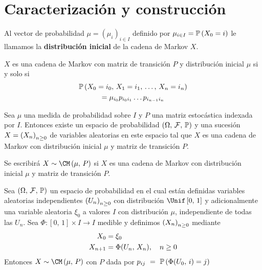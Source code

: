 \section{Caracterización y construcción}

\begin{definition}
Al vector de probabilidad $\mu = (\mu_{i})_{i\in I}$ definido por $\mu_{i\in I} = \mathbb{P}\left(X_0 = i\right)$ le llamamos la \textbf{distribución inicial} de la cadena de Markov $X$.
\end{definition}

\begin{proposition}
$X$ es una cadena de Markov con matriz de transición $P$ y distribución inicial $\mu$ si y solo si
\begin{multline}
    \mathbb{P}\left(X_0 = i_0,\, X_1 = i_1,\, \ldots,\, X_n = i_n\right) \\
    = \mu_{i_0} p_{i_0 i_1} \ldots p_{i_{n-1} i_n}
\end{multline}
\end{proposition}

\begin{theorem}
Sea $\mu$ una medida de probabilidad sobre $I$ y $P$ una matriz estocástica indexada por $I$. Entonces existe un espacio de probabilidad $(\Omega,\, \mathcal{F},\, \mathbb{P})$ y una sucesión $X = \left(X_{n}\right)_{n\geq 0}$ de variables aleatorias en este espacio tal que $X$ es una cadena de Markov con distribución inicial $\mu$ y matriz de transición $P$.
\end{theorem}

\begin{notation}
Se escribirá $X \dist \CMf{\mu}{P}$ si $X$ es una cadena de Markov con distribución inicial $\mu$ y matriz de transición $P$.
\end{notation}

\begin{theorem}
Sea $(\Omega,\, \mathcal{F},\, \mathbb{P})$ un espacio de probabilidad en el cual están definidas variables aleatorias independientes $\left(U_{n}\right)_{n\geq 0}$ con distribución $\Uniff{0}{1}$ y adicionalmente una variable aleatoria $\xi_{0}$ a valores $I$ con distribución $\mu$, independiente de todas las $U_n$. Sea $\Phi:[0,\, 1] \times I \to I$ medible y definimos $\left(X_{n}\right)_{n\geq 0}$ mediante
\begin{align}
    X_0 &{}={} \xi_0 \notag \\
    X_{n+1} &{}={} \Phi (U_n,\, X_n), \quad n \geq 0
\end{align}
Entonces $X \dist \CMf{\mu}{P}$ con $P$ dada por $p_{ij}~=~\mathbb{P}\left(\Phi(U_0,\, i) = j\right)$
\end{theorem}